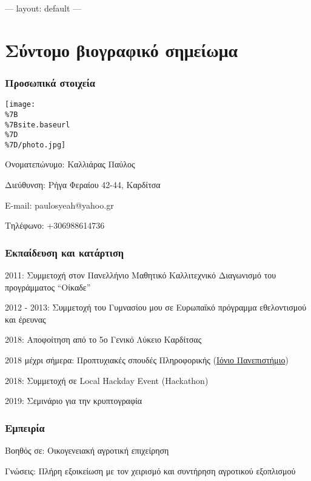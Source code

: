 --- layout: default ---

\section{Σύντομο βιογραφικό
σημείωμα}\label{ux3c3ux3cdux3bdux3c4ux3bfux3bcux3bf-ux3b2ux3b9ux3bfux3b3ux3c1ux3b1ux3c6ux3b9ux3baux3cc-ux3c3ux3b7ux3bcux3b5ux3afux3c9ux3bcux3b1}

\subsubsection{Προσωπικά
στοιχεία}\label{ux3c0ux3c1ux3bfux3c3ux3c9ux3c0ux3b9ux3baux3ac-ux3c3ux3c4ux3bfux3b9ux3c7ux3b5ux3afux3b1}

\texttt{[image: \\\%7B\\\%7Bsite.baseurl\\\%7D\\\%7D/photo.jpg]}

Ονοματεπώνυμο: Καλλιάρας Παύλος

Διεύθυνση: Ρήγα Φεραίου 42-44, Καρδίτσα

E-mail: paulosyeah@yahoo.gr

Τηλέφωνο: +306988614736

\subsubsection{Εκπαίδευση και
κατάρτιση}\label{ux3b5ux3baux3c0ux3b1ux3afux3b4ux3b5ux3c5ux3c3ux3b7-ux3baux3b1ux3b9-ux3baux3b1ux3c4ux3acux3c1ux3c4ux3b9ux3c3ux3b7}

2011: Συμμετοχή στον Πανελλήνιο Μαθητικό Καλλιτεχνικό Διαγωνισμό του
προγράμματος ``Οίκαδε''

2012 - 2013: Συμμετοχή του Γυμνασίου μου σε Ευρωπαϊκό πρόγραμμα
εθελοντισμού και έρευνας

2018: Αποφοίτηση από το 5ο Γενικό Λύκειο Καρδίτσας

2018 μέχρι σήμερα: Προπτυχιακές σπουδές Πληροφορικής
(\href{https://ionio.gr/}{Ιόνιο Πανεπιστήμιο})

2018: Συμμετοχή σε Local Hackday Event (Hackathon)

2019: Σεμινάριο για την κρυπτογραφία

\subsubsection{Εμπειρία}\label{ux3b5ux3bcux3c0ux3b5ux3b9ux3c1ux3afux3b1}

Βοηθός σε: Οικογενειακή αγροτική επιχείρηση

Γνώσεις: Πλήρη εξοικείωση με τον χειρισμό και συντήρηση αγροτικού
εξοπλισμού

